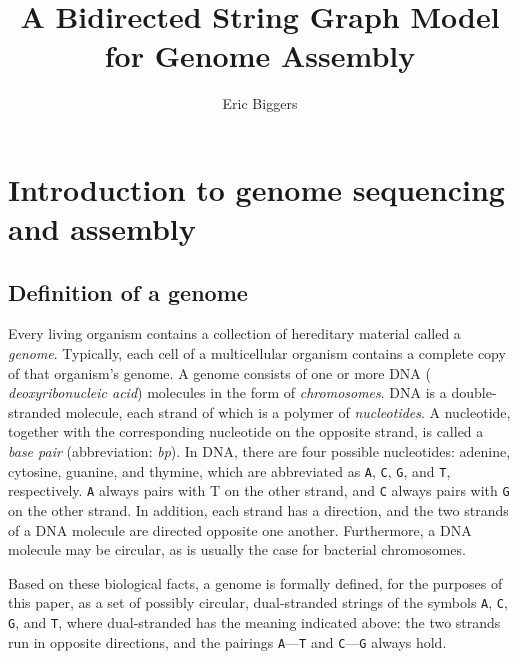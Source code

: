 \documentclass[10pt]{article}
\title{A Bidirected String Graph Model for Genome Assembly}
\author{Eric Biggers}
\newcommand\Base[1]{{\tt #1}}
\begin{document}
\maketitle


\section{Introduction to genome sequencing and assembly}

\subsection{Definition of a genome}

Every living organism contains a collection of hereditary material called a {\em
genome}.  Typically, each cell of a multicellular organism contains a complete
copy of that organism's genome.  A genome consists of one or more DNA ({\it
deoxyribonucleic acid}) molecules in the form of {\it chromosomes}.  DNA is a
double-stranded molecule, each strand of which is a polymer of {\em
nucleotides}.  A nucleotide, together with the corresponding nucleotide on the
opposite strand, is called a {\it base pair} (abbreviation: {\it bp}).  In DNA,
there are four possible nucleotides: adenine, cytosine, guanine, and thymine,
which are abbreviated as \Base{A}, \Base{C}, \Base{G}, and \Base{T},
respectively.  \Base{A} always pairs with T on the other strand, and \Base{C}
always pairs with \Base{G} on the other strand.  In addition, each strand has a
direction, and the two strands of a DNA molecule are directed opposite one
another.  Furthermore, a DNA molecule may be circular, as is usually the case
for bacterial chromosomes.

Based on these biological facts, a genome is formally defined, for the purposes
of this paper, as a set of possibly circular, dual-stranded strings of the
symbols \Base{A}, \Base{C}, \Base{G}, and \Base{T}, where dual-stranded has the
meaning indicated above: the two strands run in opposite directions, and the
pairings \Base{A}---\Base{T} and \Base{C}---\Base{G} always hold.
\end{document}
